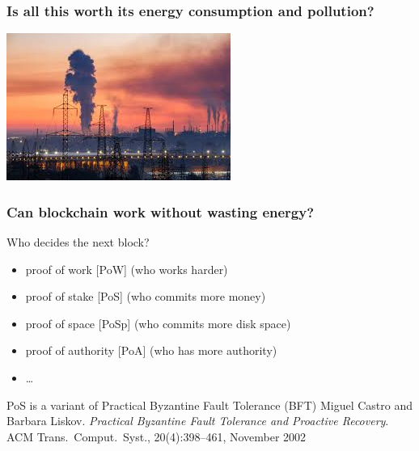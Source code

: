 \documentclass[11pt]{beamer}  %
\begin{document}
\begin{frame}\frametitle{Is all this worth its energy consumption and pollution?}

  \begin{center}
    \includegraphics[scale=1, clip=false]{pictures/pollution.jpg}
  \end{center}

\end{frame}

\begin{frame}
  \frametitle{Can blockchain work without wasting energy?}

  \begin{center}
    Who decides the next block?
  \end{center}

  \bigskip

  \begin{greenbox}{}
    \begin{itemize}
    \item proof of work [PoW] (who works harder)
    \item proof of stake [PoS] (who commits more money)
    \item proof of space [PoSp] (who commits more disk space)
    \item proof of authority [PoA] (who has more authority)
    \item \ldots
    \end{itemize}
  \end{greenbox}

  \bigskip

  \begin{greenbox}{PoS is a variant of Practical Byzantine Fault Tolerance (BFT)}
    Miguel Castro and Barbara Liskov.
    \emph{Practical Byzantine Fault Tolerance and Proactive Recovery}.
    ACM Trans.\ Comput.\ Syst., 20(4):398–461, November 2002
  \end{greenbox}

\end{frame}
\end{document}
